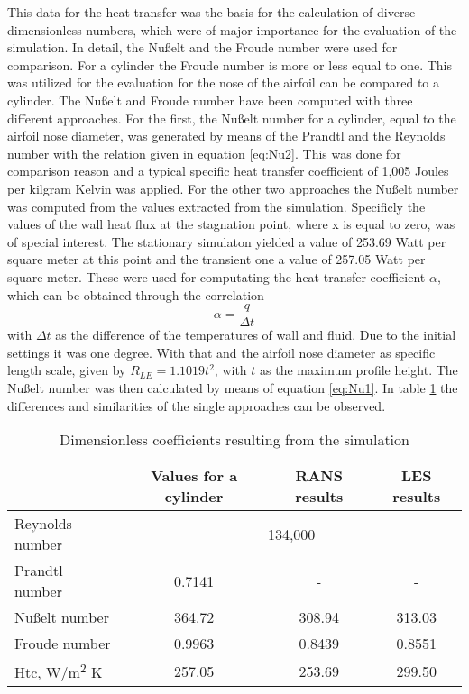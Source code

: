 This data for the heat transfer was the basis for the calculation of diverse dimensionless numbers, which were of major importance for the evaluation of the simulation.
In detail, the Nußelt and the Froude number were used for comparison. For a cylinder the Froude number is more or less equal to one. This was utilized for the evaluation for the nose of the airfoil can be compared to a cylinder.
The Nußelt and Froude number have been computed with three different approaches. For the first, the Nußelt number for a cylinder, equal to the airfoil nose diameter, was generated by means of the Prandtl and the Reynolds number with the relation given in equation \ref{eq:Nu2}. This was done for comparison reason and a typical specific heat transfer coefficient of 1,005 Joules per kilgram Kelvin was applied.
For the other two approaches the Nußelt number was computed from the values extracted from the simulation. Specificly the values of the wall heat flux at the stagnation point, where x is equal to zero, was of special interest. The stationary simulaton yielded a value of 253.69 Watt per square meter at this point and the transient one a value of 257.05 Watt per square meter. These were used  for computating the heat transfer coefficient $\alpha$, which can be obtained through the correlation
\begin{equation}
\alpha = \frac{q}{\Delta t}
\end{equation} 
with $\Delta t$ as the difference of the temperatures of wall and fluid. Due to the initial settings it was one degree. With that and the airfoil nose diameter as specific length scale, given by $R_{LE} = 1.1019 t^2$, with $t$ as the maximum profile height.
The Nußelt number was then calculated by means of equation \ref{eq:Nu1}.
In table \ref{tab:coefficients} the differences and similarities of the single approaches can be observed.

\begin{table}[ht]
\centering
\caption{Dimensionless coefficients resulting from the simulation}
\label{tab:coefficients}
\begin{tabular}{l | ccc}
&Values for a cylinder&RANS results&LES results\\
\hline
Reynolds number&\multicolumn{3}{c}{134,000}\\
Prandtl number&0.7141&-&-\\
Nußelt number&364.72&308.94&313.03\\
Froude number&0.9963&0.8439&0.8551\\
Htc, W/m\textsuperscript{2} K&257.05&253.69&299.50\\
\end{tabular}
\end{table}